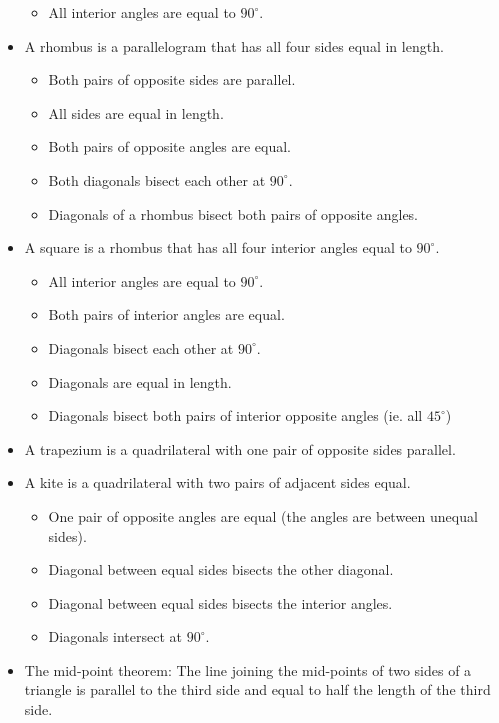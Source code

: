 \begin{itemize}
\begin{itemize}
\item All interior angles are equal to $90^{\circ}$.
\end{itemize}
\item A rhombus is a parallelogram that has all four sides equal in length.
\begin{itemize}
\item Both pairs of opposite sides are parallel.
\item All sides are equal in length.
\item Both pairs of opposite angles are equal.
\item Both diagonals bisect each other at $90^\circ$.
\item Diagonals of a rhombus bisect both pairs of opposite angles.
\end{itemize}
\item A square is a rhombus that has all four interior angles equal to $90^\circ$.
\begin{itemize}
\item All interior angles are equal to $90^\circ$.
\item Both pairs of interior angles are equal.
\item Diagonals bisect each other at $90^\circ$.
\item Diagonals are equal in length.
\item Diagonals bisect both pairs of interior opposite angles (ie. all $45^\circ$)
\end{itemize}
\item A trapezium is a quadrilateral with one pair of opposite sides parallel.
\item A kite is a quadrilateral with two pairs of adjacent sides equal.
\begin{itemize}
\item One pair of opposite angles are equal (the angles are between unequal sides).
\item Diagonal between equal sides bisects the other diagonal.
\item Diagonal between equal sides bisects the interior angles.
\item Diagonals intersect at $90^\circ$.
\end{itemize}
\item The mid-point theorem: The line joining the mid-points of two sides of a triangle is parallel to the third side and equal to half the length of the third side.
\end{itemize}

